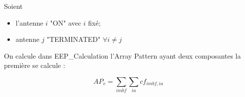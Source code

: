 \documentclass[10pt,a4paper]{article}
\begin{document}
Soient \begin{itemize}
\item l'antenne $i$ "ON" avec $i$ fixé;
\item antenne $j$ "TERMINATED" $\forall i \neq j$
\end{itemize} 

On calcule dans EEP\_Calculation l'Array Pattern ayant deux composantes la première se calcule :

\[ AP_v = \sum_{imbf} \sum_{ia} {cf}_{imbf , ia} \]
\end{document}
